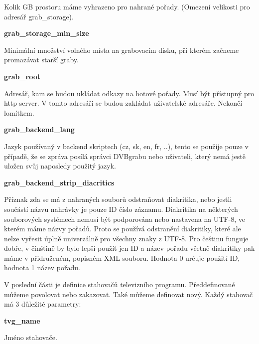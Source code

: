 Kolik GB prostoru máme vyhrazeno pro nahrané pořady. (Omezení velikosti pro adresář grab\_storage).

\vspace{10pt}

\textbf{grab\_storage\_min\_size}

Minimální množství volného místa na grabovacím disku, při kterém začneme promazávat starší graby.

\vspace{10pt}

\textbf{grab\_root}

Adresář, kam se budou ukládat odkazy na hotové pořady. Musí být přístupný pro http server. V tomto adresáři se budou zakládat uživatelské adresáře. Nekončí lomítkem.

\vspace{10pt}

\textbf{grab\_backend\_lang}

Jazyk používaný v backend skriptech (cz, sk, en, fr, ..), tento se použije pouze v případě, že se zpráva posílá správci DVBgrabu nebo uživateli, který nemá jestě uložen svůj naposledy použitý jazyk.

\vspace{10pt}

\textbf{grab\_backend\_strip\_diacritics}

Příznak zda se má z nahraných souborů odstraňovat diakritika, nebo jestli součástí názvu nahrávky je pouze ID číslo záznamu. Diakritika na některých souborových systémech nemusí být podporována nebo nastavena na UTF-8, ve kterém máme názvy pořadů. Proto se používá odstranění diakritiky, které ale nelze vyřesit úplně univerzálně pro všechny znaky z UTF-8. Pro češtinu funguje dobře, v čínštině by bylo lepší použít jen ID a název pořadu včetně diakritiky pak máme v přidruženém, popisném XML souboru. Hodnota 0 určuje použití ID, hodnota 1 název pořadu.

\vspace{10pt}

V poslední části je definice stahovačů televizního programu. Předdefinované můžeme povolovat nebo zakazovat. Také můžeme definovat nový. Každý stahovač má 3 důležité parametry:

\vspace{10pt}

\textbf{tvg\_name}

Jméno stahovače.

\vspace{10pt}

